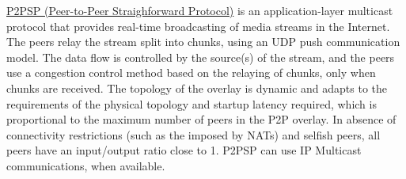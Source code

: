 

\href{https://p2psp.github.io}{P2PSP (Peer-to-Peer Straighforward
  Protocol)} is an application-layer multicast protocol that provides
real-time broadcasting of media streams in the Internet. The peers
relay the stream split into chunks, using an UDP push communication
model. The data flow is controlled by the source(s) of the stream, and
the peers use a congestion control method based on the relaying of
chunks, only when chunks are received. The topology of the overlay is
dynamic and adapts to the requirements of the physical topology and
startup latency required, which is proportional to the maximum number
of peers in the P2P overlay. In absence of connectivity restrictions
(such as the imposed by NATs) and selfish peers, all peers have an
input/output ratio close to 1. P2PSP can use IP Multicast
communications, when available.
